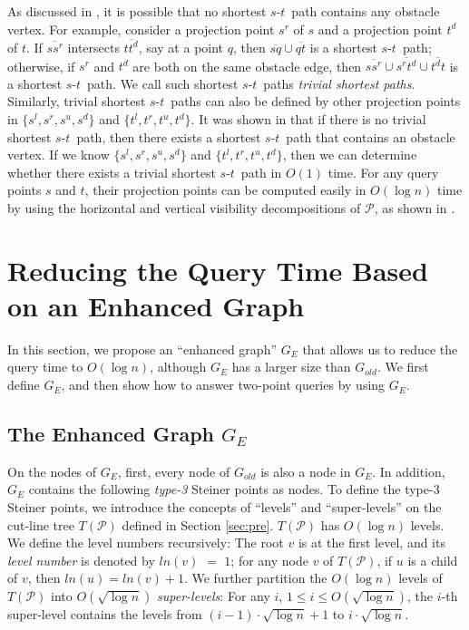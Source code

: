 \documentclass[english,runningheads,11pt]{llncs}
\def\calP{\mathcal{P}}
\def\st{$s$-$t$}
\begin{document}
As discussed in \cite{ref:ChenSh00},
it is possible that no shortest \st\ path contains any
obstacle vertex.
For example, consider
a projection point $s^r$ of $s$ and a projection point $t^d$ of $t$. If
$\overline{ss^r}$ intersects $\overline{tt^d}$, say at a point $q$, then
$\overline{sq}\cup \overline{qt}$ is a shortest \st\ path; otherwise, if $s^r$ and
$t^d$ are both on the same obstacle edge, then $\overline{ss^r}\cup
\overline{s^rt^d}\cup\overline{t^dt}$ is a shortest \st\ path. We call
such shortest \st\ paths {\em trivial shortest paths}. Similarly, trivial shortest
\st\ paths can also be defined by other projection points in $\{s^l,s^r,s^u,s^d\}$
and $\{t^l,t^r,t^u,t^d\}$.
It was shown in \cite{ref:ChenSh00} that if there is no trivial
shortest \st\ path, then there exists a shortest \st\ path that
contains an obstacle vertex. If we know $\{s^l,s^r,s^u,s^d\}$
and $\{t^l,t^r,t^u,t^d\}$, then we can determine whether there exists
a trivial shortest \st\ path in $O(1)$ time. For any query points $s$ and $t$,
their projection points can be computed easily in $O(\log n)$ time by using
the horizontal and vertical visibility decompositions of $\calP$, as shown in
\cite{ref:ChenSh00}.


\section{Reducing the Query Time Based on an Enhanced Graph}
\label{sec:newgraph}

In this section, we propose an ``enhanced graph'' $G_E$ that allows us to reduce
the query time to $O(\log n)$, although
$G_E$ has a larger size than $G_{old}$. We
first define $G_E$, and then show how to answer two-point queries by using $G_E$.


\subsection{The Enhanced Graph $G_E$}

On the nodes of $G_E$, first, every node of $G_{old}$ is also a node
in $G_E$. In addition, $G_E$
contains the following {\em type-3} Steiner points as nodes.
To define the type-3 Steiner points, we introduce the concepts of ``levels'' and
``super-levels'' on  the cut-line tree $T(\calP)$ defined in Section
\ref{sec:pre}.
$T(\calP)$ has $O(\log n)$ levels. We
define the level numbers recursively: The root $v$
is at the first level, and its {\em level number} is denoted by $ln(v)$ $=$ $1$;
for any node $v$ of $T(\calP)$, if $u$ is a child of $v$, then $ln(u)=ln(v)+1$.
We further partition the $O(\log n)$ levels of $T(\calP)$ into $O(\sqrt{\log
n})$ {\em super-levels}: For any $i$, $1\leq i\leq O(\sqrt{\log
n})$, the $i$-th super-level contains the levels from
$(i-1)\cdot \sqrt{\log n}+1$ to $i\cdot \sqrt{\log n}$.
\end{document}
